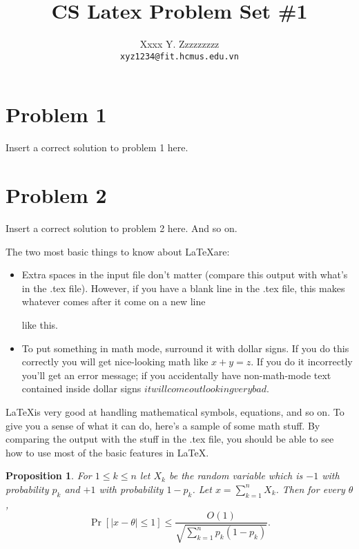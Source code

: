 \documentclass[12pt]{article}
\title{CS Latex Problem Set \#1}
\author{Xxxx Y. Zzzzzzzzz\\
{\tt xyz1234@fit.hcmus.edu.vn}
}
\newtheorem{prop}{Proposition}
\begin{document}
\maketitle

\section{Problem 1}
 
Insert a correct solution to problem 1 here.

\section{Problem 2}

Insert a correct solution to problem 2 here.  And so on.  

\medskip

The two most basic things to know about \LaTeX are:

\begin{itemize}
\item Extra         spaces     in     the     input     file
don't
matter
(compare this output with what's in the .tex file).  However, if you have a blank
line in the .tex file, this makes whatever comes after it come on a new line

like this.

\item To put something in math mode, surround it with dollar signs.  If you do
this correctly you will get nice-looking math like $x + y = z$.  If you do it incorrectly
you'll get an error message; if you accidentally have non-math-mode text contained inside
dollar signs $it will come out looking very bad.$

\end{itemize}

\LaTeX is very good at handling mathematical symbols, equations, and so on.  To give you
a sense of what it can do, 
here's a sample of some math stuff.  
By comparing the output with the stuff in the 
.tex file, you should be able to see how to use most of the basic features in 
\LaTeX.  

\bigskip
\bigskip

\begin{prop}
For $1 \leq k \leq n$ let $X_k$ be the random variable which is $-1$ with probability 
$p_k$ and $+1$ with probability $1-p_k$\@.  Let $x = \sum_{k=1}^n X_k$.  Then for every $\theta$,
\[\Pr[|x-\theta| \leq 1] \leq \frac{O(1)}{\sqrt{\sum_{k=1}^n p_k(1-p_k)}}.\]
\end{prop}
\end{document}
